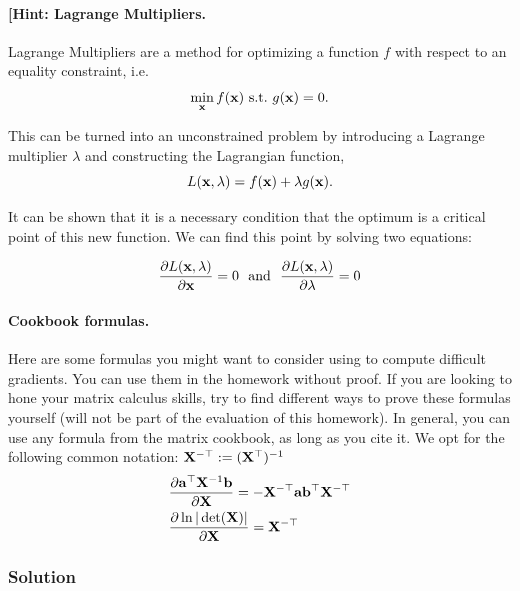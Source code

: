 \documentclass[submit]{harvardml}
\begin{document}
\begin{problem}
\paragraph{[Hint: Lagrange Multipliers.} Lagrange Multipliers are a method for
optimizing a function $f$ with respect to an
equality constraint, i.e. 
\[\min_{\mathbf{x}} f(\mathbf{x})\ \text{s.t.}\ g(\mathbf{x}) = 0.\]

This can be turned into an unconstrained problem by introducing a
Lagrange multiplier $\lambda$ and constructing the Lagrangian function,
\[L(\mathbf{x}, \lambda) =  f(\mathbf{x}) + \lambda g(\mathbf{x}).\]

It can be shown that it is a necessary condition that the optimum 
is a critical point of this new function. We can find this point by solving two equations:

\[\frac{\partial L(\mathbf{x}, \lambda)}{\partial  \mathbf{x}} = 0  \ \ \text{and}\  \  \frac{\partial L(\mathbf{x}, \lambda)}{\partial \lambda} = 0 \]


\paragraph{Cookbook formulas.} Here are some formulas you might want to consider
using to compute difficult gradients. You can use them  in the homework
without proof. If you are looking to hone your matrix calculus skills, try to
find different ways to prove these formulas yourself (will not be part of the
evaluation of this homework). In general, you can use any formula from the matrix cookbook,
as long as you cite it. We opt for the following common notation:
$\mathbf{X}^{-\top} := (\mathbf{X}^{\top})^{-1}$
\begin{align*}
  & \frac{\partial \mathbf{a}^\top \mathbf{X}^{-1} \mathbf{b}}{\partial \mathbf{X}} = - \mathbf{X}^{-\top} \mathbf{a} \mathbf{b}^\top \mathbf{X}^{-\top} \\
  & \frac{\partial \ln | \det (\mathbf{X}) |}{\partial \mathbf{X}} = \mathbf{X}^{-\top}
 \end{align*}
 \end{problem}



\subsubsection*{Solution}
\end{document}

